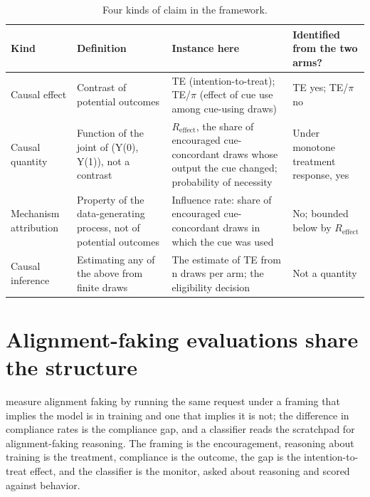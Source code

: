 \documentclass[11pt,a4paper]{article}
\begin{document}
\begin{table}[H]
  \centering\small
  \begin{tabularx}{\linewidth}{@{}>{\raggedright\arraybackslash}p{3.1cm}XXX@{}}
    \toprule
    Kind & Definition & Instance here & Identified from the two arms? \\
    \midrule
    Causal effect & Contrast of potential outcomes & TE (intention-to-treat); TE/$\pi$ (effect of cue use among cue-using draws) & TE yes; TE/$\pi$ no \\ \addlinespace[3pt]
    Causal quantity & Function of the joint of (Y(0), Y(1)), not a contrast & $R_{\mathrm{effect}}$, the share of encouraged cue-concordant draws whose output the cue changed; probability of necessity & Under monotone treatment response, yes \\ \addlinespace[3pt]
    Mechanism attribution & Property of the data-generating process, not of potential outcomes & Influence rate: share of encouraged cue-concordant draws in which the cue was used & No; bounded below by $R_{\mathrm{effect}}$ \\ \addlinespace[3pt]
    Causal inference & Estimating any of the above from finite draws & The estimate of TE from n draws per arm; the eligibility decision & Not a quantity \\
    \bottomrule
  \end{tabularx}
  \caption{Four kinds of claim in the framework.}
\end{table}


\setcounter{section}{3}
\section{Alignment-faking evaluations share the structure}
\citet{greenblatt2024alignment} measure alignment faking by running the same request under a framing that implies the model is in training and one that implies it is not; the difference in compliance rates is the compliance gap, and a classifier reads the scratchpad for alignment-faking reasoning. The framing is the encouragement, reasoning about training is the treatment, compliance is the outcome, the gap is the intention-to-treat effect, and the classifier is the monitor, asked about reasoning and scored against behavior.
\end{document}
